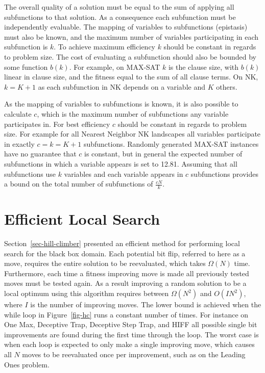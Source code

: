 The overall quality of a solution must be equal to the sum of applying all subfunctions to that
solution. As a consequence each subfunction must be independently evaluable.
The mapping of variables to subfunctions (epistasis) must also be known, and
the maximum number of variables participating in each subfunction is $k$.
To achieve maximum efficiency $k$ should be constant in regards to problem size. The cost
of evaluating a subfunction should also be bounded by some function $b(k)$. For example, on MAX-SAT
$k$ is the clause size, with $b(k)$ linear in clause size, and the fitness equal to the sum of
all clause terms. On NK, $k=K+1$ as each subfunction in NK depends on a variable and $K$ others.

As the mapping of variables to subfunctions is known, it is also possible to calculate $c$, which
is the maximum number of subfunctions any variable participates in. For best efficiency $c$ should
be constant in regards to problem size. For example for all Nearest Neighbor NK landscapes all variables
participate in exactly $c=k=K+1$ subfunctions. Randomly generated MAX-SAT instances have no guarantee
that $c$ is constant, but in general the expected number of subfunctions in which a variable appears is set to 12.81.
Assuming that all subfunctions use $k$ variables and each variable appears in $c$ subfunctions
provides a bound on the total number of subfunctions of $\frac{cN}{k}$.

\section{Efficient Local Search}
\label{sec-whitley-ls}
Section~\ref{sec-hill-climber} presented an efficient method for performing local search for the black
box domain. Each potential bit flip, referred to here as a move, requires the entire solution to be reevaluated, which takes $\Omega(N)$ time.
Furthermore, each time a fitness improving move is made all previously tested moves must be tested again. As a result
improving a random solution to be a local optimum using this algorithm requires between $\Omega(N^2)$ and $O(IN^2)$, where $I$ is the number
of improving moves. The lower bound is achieved when the while loop in Figure~\ref{fig-hc} runs a constant number of times.
For instance on One Max, Deceptive Trap, Deceptive Step Trap, and HIFF all possible single bit improvements are found during
the first time through the loop. The worst case is when each loop is expected to only make a single improving move, which causes
all $N$ moves to be reevaluated once per improvement, such as on the Leading Ones problem.

